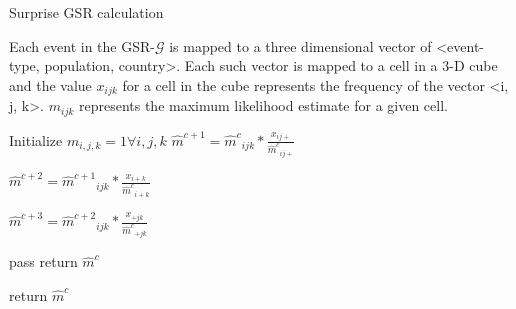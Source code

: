 \begin{algorithm}
\caption{Surprise GSR calculation}
\begin{algorithmic}[1]


\State Each event in the GSR-$\mathcal{G}$ is mapped to a three dimensional vector of <event-type, population, country>. Each such vector
       is mapped to a cell in a 3-D cube and the value $x_{ijk}$ for a cell in the cube represents the frequency of the vector <i, j, k>.
       $m_{ijk}$ represents the maximum likelihood estimate for a given cell.

\State Initialize $m_{i,j,k}=1 \forall i,j,k$
        \State $\hat{m}^{c+1} = {\hat{m}^c}_{ijk}*\frac{x_{ij+}}{{\hat{m}^c}_{ij+}} $

        \State $\hat{m}^{c+2} = {\hat{m}^{c+1}}_{ijk}*\frac{x_{i+k}}{{\hat{m}^c}_{i+k}} $

        \State $\hat{m}^{c+3} = {\hat{m}^{c+2}}_{ijk}*\frac{x_{+jk}}{{\hat{m}^c}_{+jk}} $

    \EndFor

    pass
    \State return {$\hat{m}^c$}

\EndIf

\EndFor

\State  return {$\hat{m}^c$}

\EndProcedure

\end{algorithmic}

\label{algo:maxent}
\end{algorithm}
